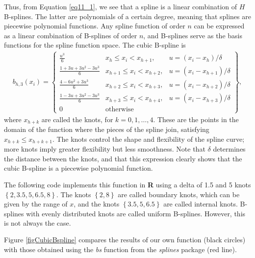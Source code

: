 Thus, from Equation \ref{eq11_1}, we see that a spline is a linear combination of \(H\) B-splines. The latter are polynomials of a certain degree, meaning that splines are piecewise polynomial functions. Any spline function of order \(n\) can be expressed as a linear combination of B-splines of order \(n\), and B-splines serve as the basis functions for the spline function space.
The cubic B-spline is 
\begin{align*}
	b_{h,3}(x_i)=\begin{Bmatrix}
		\frac{u^3}{6} & x_h \leq x_i < x_{h+1}, & u=(x_i-x_h)/\delta\\
		\frac{1+3u+3u^2-3u^3}{6} & x_{h+1} \leq x_i < x_{h+2}, & u=(x_i-x_{h+1})/\delta\\
		\frac{4-6u^2+3u^3}{6} & x_{h+2} \leq x_i < x_{h+3}, & u=(x_i-x_{h+2})/\delta\\
		\frac{1-3u+3u^2-3u^3}{6} & x_{h+3} \leq x_i < x_{h+4}, & u=(x_i-x_{h+3})/\delta\\
		0 & \text{otherwise}
	\end{Bmatrix},
\end{align*}
where \(x_{h+k}\) are called the knots, for \(k=0,1,\dots,4\). These are the points in the domain of the function where the pieces of the spline join, satisfying \(x_{h+k} \leq x_{h+k+1}\). The knots control the shape and flexibility of the spline curve; more knots imply greater flexibility but less smoothness. Note that \(\delta\) determines the distance between the knots, and that this expression clearly shows that the cubic B-spline is a piecewise polynomial function.

The following code implements this function in \textbf{R} using a delta of 1.5 and 5 knots \( \left\{2, 3.5, 5, 6.5, 8\right\} \). The knots \( \left\{2, 8\right\} \) are called boundary knots, which can be given by the range of $x$, and the knots \( \left\{3.5, 5, 6.5\right\} \) are called internal knots. B-splines with evenly distributed knots are called uniform B-splines. However, this is not always the case.

Figure \ref{figCubicBspline} compares the results of our own function (black circles) with those obtained using the \textit{bs} function from the \textit{splines} package (red line).

